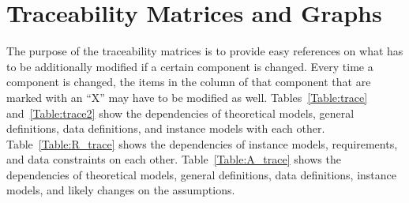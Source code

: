 \documentclass[12pt]{article}
\begin{document}
\section{Traceability Matrices and Graphs}

The purpose of the traceability matrices is to provide easy references on what
has to be additionally modified if a certain component is changed.  Every time a
component is changed, the items in the column of that component that are marked
with an ``X'' may have to be modified as well.  Tables~\ref{Table:trace} 
and~\ref{Table:trace2} show the dependencies of theoretical models, general 
definitions, data definitions, and instance models with each other. 
Table~\ref{Table:R_trace} shows the dependencies of instance models, 
requirements, and data constraints on each other. Table~\ref{Table:A_trace} 
shows the dependencies of theoretical models, general definitions, data 
definitions, instance models, and likely changes on the assumptions.

\setlength{\tabcolsep}{6pt}
\end{document}
